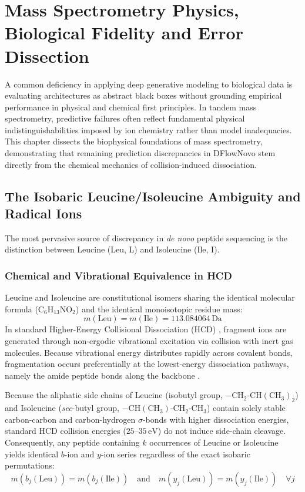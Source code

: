 \chapter{Mass Spectrometry Physics, Biological Fidelity and Error Dissection}

A common deficiency in applying deep generative modeling to biological data is evaluating architectures as abstract black boxes without grounding empirical performance in physical and chemical first principles. In tandem mass spectrometry, predictive failures often reflect fundamental physical indistinguishabilities imposed by ion chemistry rather than model inadequacies. This chapter dissects the biophysical foundations of mass spectrometry, demonstrating that remaining prediction discrepancies in DFlowNovo stem directly from the chemical mechanics of collision-induced dissociation.

\section{The Isobaric Leucine/Isoleucine Ambiguity and Radical Ions}

The most pervasive source of discrepancy in \emph{de novo} peptide sequencing is the distinction between Leucine (Leu, L) and Isoleucine (Ile, I). 

\subsection{Chemical and Vibrational Equivalence in HCD}

Leucine and Isoleucine are constitutional isomers sharing the identical molecular formula ($\text{C}_6\text{H}_{13}\text{NO}_2$) and the identical monoisotopic residue mass:
\begin{equation}
m(\text{Leu}) = m(\text{Ile}) = 113.084064\,\text{Da}
\label{eq:isobaric_mass}
\end{equation}
In standard Higher-Energy Collisional Dissociation (HCD) \citep{Olsen2007}, fragment ions are generated through non-ergodic vibrational excitation via collision with inert gas molecules. Because vibrational energy distributes rapidly across covalent bonds, fragmentation occurs preferentially at the lowest-energy dissociation pathways, namely the amide peptide bonds along the backbone \citep{Paizs2005}. 

Because the aliphatic side chains of Leucine (isobutyl group, $-\text{CH}_2\text{-CH}(\text{CH}_3)_2$) and Isoleucine (\emph{sec}-butyl group, $-\text{CH}(\text{CH}_3)\text{-CH}_2\text{-CH}_3$) contain solely stable carbon-carbon and carbon-hydrogen $\sigma$-bonds with higher dissociation energies, standard HCD collision energies ($25\text{--}35\,\text{eV}$) do not induce side-chain cleavage. Consequently, any peptide containing $k$ occurrences of Leucine or Isoleucine yields identical $b$-ion and $y$-ion series regardless of the exact isobaric permutations:
\begin{equation}
m(b_j(\text{Leu})) = m(b_j(\text{Ile})) \quad \text{and} \quad m(y_j(\text{Leu})) = m(y_j(\text{Ile})) \quad \forall j
\label{eq:identical_ladder}
\end{equation}

